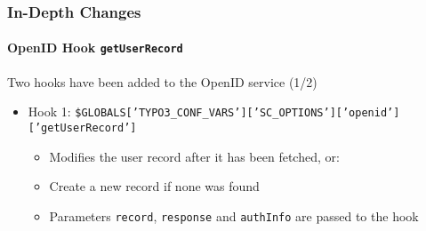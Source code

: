 \begin{frame}[fragile]
	\frametitle{In-Depth Changes}
	\framesubtitle{OpenID Hook \texttt{getUserRecord}}

	\lstset{basicstyle=\tiny\ttfamily}

	Two hooks have been added to the OpenID service (1/2)

		\begin{itemize}

			\item Hook 1:\newline
				\smaller\smaller
					\texttt{\$GLOBALS['TYPO3\_CONF\_VARS']['SC\_OPTIONS']['openid']['getUserRecord']}
				\normalsize

				\begin{itemize}
					\item Modifies the user record after it has been fetched, or:
					\item Create a new record if none was found
					\item Parameters \texttt{record}, \texttt{response} and \texttt{authInfo} are passed to the hook
				\end{itemize}

		\end{itemize}

\end{frame}

